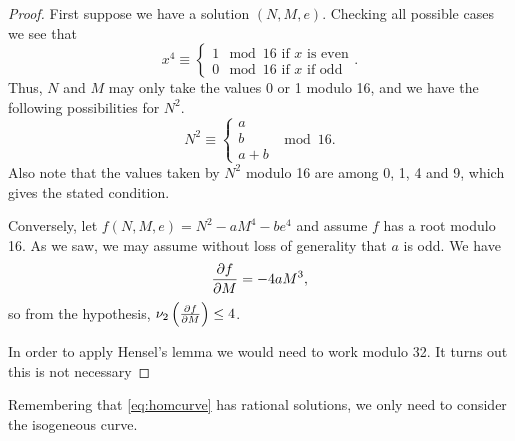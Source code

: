 \documentclass[12pt, a4paper]{amsart}
\begin{document}
\begin{proof}
  First suppose we have a solution $(N, M, e)$. Checking all possible cases
  we see that
  \[x^4 \equiv
    \begin{cases}
      1 \mod{16} \text{ if } x \text{ is even} \\
      0 \mod{16} \text{ if } x \text{ if odd}
    \end{cases}.
  \]
  Thus, $N$ and $M$ may only take the values 0 or 1 modulo 16, and we have the
  following possibilities for $N^2$.
  \[N^2 \equiv
    \begin{cases}
      a \\
      b \\
      a+ b
    \end{cases} \mod{16}.
  \]
  Also note that the values taken by $N^2$ modulo 16 are among 0, 1, 4 and 9,
  which gives the stated condition.

  Conversely, let $f(N,M,e) = N^2 - aM^4 - be^4$ and assume $f$ has a root
  modulo 16. As we saw, we may assume without loss of generality that $a$ is
  odd. We have
  \[\frac{\partial f}{\partial M} = -4aM^3,\]
  so from the hypothesis, $\nu_2\left(\frac{\partial f}{\partial M} \right) \leq 4$.

  In order to apply Hensel's lemma we would need to work modulo 32. It turns out
  this is not necessary 

\end{proof}

Remembering that \autoref{eq:homcurve} has
rational solutions, we only need to consider the isogeneous curve.
\end{document}
